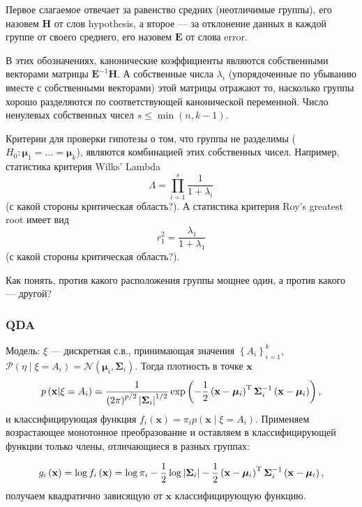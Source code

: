 Первое слагаемое отвечает за равенство средних (неотличимые группы), его назовем $\mathbf{H}$ от слов hypothesis, а второе --- за отклонение данных в каждой группе от своего среднего, его назовем $\mathbf{E}$ от слова error.

В этих обозначениях, канонические коэффициенты являются собственными векторами матрицы $\mathbf{E}^{-1}\mathbf{H}$. А собственные числа $\lambda_i$ (упорядоченные по убыванию вместе с собственными векторами) этой матрицы отражают то, насколько группы хорошо разделяются по соответствующей канонической переменной. Число ненулевых собственных чисел $s\le \min(n, k-1)$.

Критерии для проверки гипотезы о том, что группы не разделимы ($H_0:\bm\mu_1=\ldots=\bm\mu_k$), являются комбинацией этих собственных чисел. Например, статистика критерия Wilks' Lambda $$\Lambda = \prod_{i=1}^s {\frac{1}{1 + \lambda_i}}$$ (с какой стороны критическая область?). А статистика критерия Roy's greatest root имеет вид $$r_1^2 = \frac{\lambda_1}{1+\lambda_1} $$ (с какой стороны критическая область?).

Как понять, против какого расположения группы мощнее один, а против какого --- другой?

	\subsubsection{QDA} %
	\label{ssub:qda}

	Модель: $\xi$ --- дискретная с.в., принимающая значения $\left\lbrace A_i\right\rbrace_{i=1}^k$, $\mathcal P(\eta\mid \xi = A_i) = \mathcal N\left(\bm{\mu}_i, \bm{\Sigma}_i\right)$. Тогда плотность в точке $\mathbf{x}$
		$$p\left(\mathbf{x}\middle\vert \xi = A_i\right) = \frac{1}{\left(2\pi\right)^{p/2}\left\vert\bm{\Sigma}_i\right\vert^{1/2}} \exp\left(-\frac{1}{2}\left(\mathbf{x} - \bm{\mu}_i\right)^{\mathrm{T}}\bm{\Sigma}_i^{-1}\left(\mathbf{x} - \bm{\mu}_i\right)\right),$$
		и классифицирующая функция $f_i\left(\mathbf{x}\right) = \pi_i p\left(\mathbf{x}\middle\vert \xi = A_i\right)$. Применяем возрастающее монотонное преобразование и оставляем в классифицирующей функции только члены, отличающиеся в разных группах:

		$$g_i\left(\mathbf{x}\right) = \log f_i\left(\mathbf{x}\right) = \log \pi_i - \frac{1}{2}\log\left\vert\bm{\Sigma}_i\right\vert -  \frac{1}{2}\left(\mathbf{x} - \bm{\mu}_i\right)^{\mathrm{T}}\bm{\Sigma}_i^{-1}\left(\mathbf{x} - \bm{\mu}_i\right),$$
получаем квадратично зависящую от $\mathbf{x}$ классифицирующую функцию.

